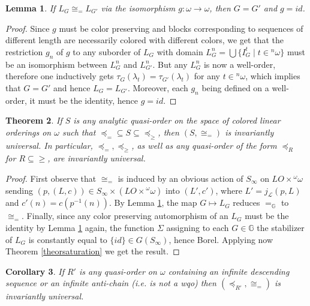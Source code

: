 \documentclass{amsart}
\newtheorem{theorem}{Theorem}[section]
\newtheorem{lemma}[theorem]{Lemma}
\newtheorem{corollary}[theorem]{Corollary}
\theoremstyle{definition}
\theoremstyle{remark}
\begin{document}
\begin{lemma}\label{lemmaidentity}
If $L_G \cong_= L_{G'}$ via the isomorphism $g \colon \omega \to \omega$,
then $G = G'$ and $g = id$.
\end{lemma}

\begin{proof}
Since $g$ must be color preserving and blocks corresponding to sequences
of different length are necessarily colored with different colors,
we get that the restriction $g_n$ of $g$ to any suborder of $L_G$ with
domain $L^n_G = \bigcup \{ I^t_G \mid t \in {}^n \omega \}$ must be an
isomorphism between $L^n_G$ and $L^n_{G'}$. But any $L^n_G$ is now a
well-order, therefore one inductively gets $\tau_G(\lambda_t) =
\tau_{G'}(\lambda_t)$ for any $t \in {}^n \omega$, which implies that
$G = G'$ and hence $L_G = L_{G'}$. Moreover,
each $g_n$ being defined on a well-order, it must be the identity,
hence $g = id$.
\end{proof}

\begin{theorem}\label{theorcoloredorders}
If $S$ is any analytic quasi-order on the space of colored linear orderings on $\omega $
such that ${\preceq_=}\subseteq S \subseteq {\preceq_\geq}$, then $(S, \cong_=)$
is invariantly universal. In particular, $\preceq_=, \preceq_\ge$, as
well as any quasi-order of the form $\preceq_R$ for $R
\subseteq {\ge}$, are invariantly universal.
\end{theorem}

\begin{proof}
First observe that $\cong_=$ is induced by an obvious action of
$S_\infty$ on $LO \times {}^\omega \omega$ sending $(p,(L,c)) \in
S_\infty \times (LO \times {}^\omega \omega)$ into
$(L',c')$, where $L' = j_{\mathcal{L}}(p,L)$ and $c'(n) = c(p^{-1}(n))$. By Lemma
\ref{lemmaidentity}, the map $G \mapsto L_G$ reduces  $=_{\mathbb{G}}$ to $\cong_=$.
Finally, since
any color preserving automorphism of an $L_G$ must be the identity by Lemma
\ref{lemmaidentity} again, the function $\Sigma$ assigning to each $G
\in {\mathbb{G}}$ the
stabilizer of $L_G$ is constantly equal to $\{ id \} \in
G(S_\infty)$, hence Borel. Applying now Theorem \ref{theorsaturation}
we get the result.
\end{proof}

\begin{corollary}
If $R'$ is any quasi-order on $\omega$ containing an infinite descending sequence or an infinite anti-chain (i.e. is not a wqo) then $(\preceq_{R'}, \cong_=)$ is invariantly
universal.
\end{corollary}
\end{document}
